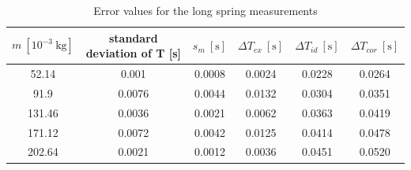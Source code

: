 \documentclass[a4paper, 10pt]{article}
\newcommand{\unit}[1]{~\mathrm{#1}}
\begin{document}
\begin{justify}
\begin{table}[!h]
\begin{tabular}{|c|c|c|c|c|c|}
    \hline
    \end{tabular}
    \end{table}
    \begin{table}[!h]
        \centering
        \caption{Error values for the long spring measurements}
        \begin{tabular}{|c|c|c|c|c|c|} 
        \hline
        $m~[10^{-3}\unit{kg}]$ & standard deviation of T [s]& $s_m\unit{[s]}$ &
        $\Delta T_{ex}\unit{[s]}$     & $\Delta T_{id}\unit{[s]}$     & $\Delta
        T_{cor}\unit{[s]}$     \\ 
        \hline
        52.14     & 0.001                & 0.0008                       & 0.0024 & 0.0228 & 0.0264  \\ 
        \hline
        91.9      & 0.0076                & 0.0044                       & 0.0132 & 0.0304 & 0.0351  \\ 
        \hline
        131.46    & 0.0036                & 0.0021                       & 0.0062 & 0.0363   & 0.0419  \\ 
        \hline
        171.12    & 0.0072                & 0.0042                       & 0.0125  & 0.0414 & 0.0478  \\ 
        \hline
        202.64    & 0.0021                & 0.0012                       & 0.0036 & 0.0451 & 0.0520  \\
        \hline
        \end{tabular}
        \end{table}

\end{justify}
\end{document}
